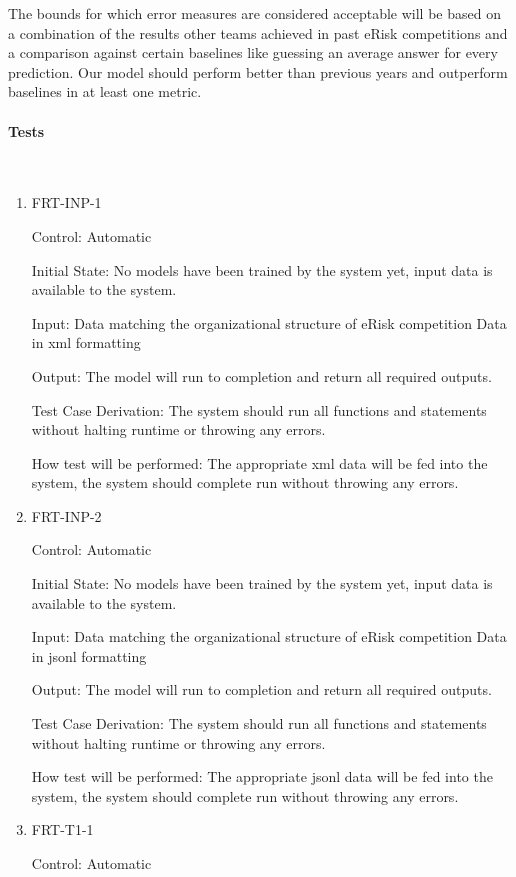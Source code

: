 \documentclass[12pt, titlepage]{article}
\newcommand{\myparagraph}[1]{\paragraph{#1}\mbox{}\\}
\begin{document}
The bounds for which error measures are considered acceptable will be based on a combination of the results other teams achieved in past eRisk competitions and a comparison against certain baselines like guessing an average answer for every prediction. Our model should perform better than previous years and outperform baselines in at least one metric.

\myparagraph{Tests}

\begin{enumerate}

\item{FRT-INP-1\\}

Control: Automatic

Initial State: No models have been trained by the system yet, input data is available to the system.

Input: Data matching the organizational structure of eRisk competition Data in xml formatting

Output: The model will run to completion and return all required outputs.

Test Case Derivation: The system should run all functions and statements without halting runtime or throwing any errors.

How test will be performed: The appropriate xml data will be fed into the system, the system should complete run without throwing any errors.

\item{FRT-INP-2\\}

Control: Automatic

Initial State: No models have been trained by the system yet, input data is available to the system.

Input: Data matching the organizational structure of eRisk competition Data in jsonl formatting

Output: The model will run to completion and return all required outputs.

Test Case Derivation: The system should run all functions and statements without halting runtime or throwing any errors.

How test will be performed: The appropriate jsonl data will be fed into the system, the system should complete run without throwing any errors.

\item{FRT-T1-1\\}

Control: Automatic


\end{enumerate}
\end{document}
